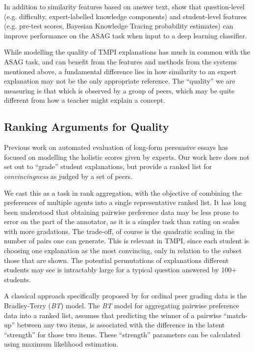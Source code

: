 \documentclass[notitlepage,12pt]{jedm}
\begin{document}
In addition to similarity features based on answer text, \cite{zhang_deep_2016} 
show that question-level (e.g. difficulty, expert-labelled knowledge 
components) and student-level features (e.g. pre-test scores, Bayesian 
Knowledge Tracing probability estimates) can improve performance on the ASAG 
task when input to a deep learning classifier.

While modelling the quality of TMPI explanations has much in common with the 
ASAG task, and can benefit from the features and methods from the systems 
mentioned above, a fundamental difference lies in how similarity to an expert 
explanation may not be the only appropriate reference.
The ``quality'' we are measuring is that which is observed by a group of peers, 
which may be quite different from how a teacher might explain a concept.

\subsection{Ranking Arguments for Quality}\label{sec:related_work:arg_quality}

Previous work on automated evaluation of long-form persuasive essays 
\cite{ghosh_coarse-grained_2016,klebanov_argumentation_2016,nguyen_argument_2018}
 has focused on modelling the holistic scores given by experts.
Our work here does not set out to ``grade'' student explanations, but provide a 
ranked list for \textit{convincingness} as judged by a set of peers.

We cast this as a task in rank aggregation, with the objective of combining the 
preferences of multiple agents into a single representative ranked list.
It has long been understood that obtaining pairwise preference data may be 
less prone to error on the part of the annotator, as it is a simpler task than 
rating on scales with more gradations.
The trade-off, of course is the quadratic scaling in the number of pairs one 
can generate. 
This is relevant in TMPI, since each student is choosing one explanation as 
the most convincing, only in relation to the subset those that are shown. 
The potential permutations of explanations different students may see is 
intractably large for a typical question answered by 100+ students.

A classical approach specifically proposed by \cite{raman_methods_2014} for 
ordinal peer grading data is the Bradley-Terry (\textit{BT}) model.
The \textit{BT} model \cite{bradley_rank_1952} for aggregating pairwise 
preference data into a ranked list, assumes that predicting the winner of a 
pairwise ``match-up'' between any two items, is associated with the difference 
in the latent ``strength'' for those two items. 
These ``strength'' parameters can be calculated using maximum likelihood 
estimation.
\end{document}
